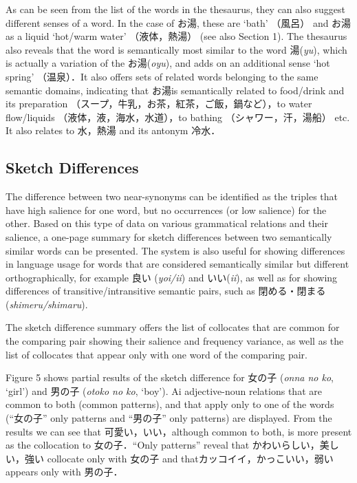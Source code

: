\documentclass[english]{jnlp_1.4}
\begin{document}
As can be seen from the list of the words in the thesaurus, they can also suggest different senses of a word. In the case of お湯, these are `bath' （風呂） and お湯 as a liquid `hot/warm water' （液体，熱湯） (see also Section 1). The thesaurus also reveals that the word is semantically most similar to the word 湯(\textit{yu}), which is actually a variation of the お湯(\textit{oyu}), and adds on an additional sense `hot spring' （温泉）．It also offers sets of related words belonging to the same semantic domains, indicating that お湯is semantically related to food/drink and its preparation （スープ，牛乳，お茶，紅茶，ご飯，鍋など），to water flow/liquids （液体，液，海水，水道），to bathing （シャワー，汗，湯船） etc. It also relates to 水，熱湯 and its antonym 冷水．



\subsection{Sketch Differences}

The difference between two near-synonyms can be identified as the triples that have high salience for one word, but no occurrences (or low salience) for the other. Based on this type of data on various grammatical relations and their salience, a one-page summary for sketch differences between two semantically similar words can be presented. The system is also useful for showing differences in language usage for words that are considered semantically similar but different orthographically, for example 良い (\textit{yoi/ii}) and いい(\textit{ii}), as well as for showing differences of transitive/intransitive semantic pairs, such as 閉める・閉まる(\textit{shimeru/shimaru}).

The sketch difference summary offers the list of collocates that are common for the comparing pair showing their salience and frequency variance, as well as the list of collocates that appear only with one word of the comparing pair. 

Figure 5 shows partial results of the sketch difference for 女の子 (\textit{onna no ko}, `girl') and 男の子 (\textit{otoko no ko}, `boy'). Ai adjective-noun relations that are common to both (common patterns), and that apply only to one of the words (``女の子'' only patterns and ``男の子'' only patterns) are displayed. From the results we can see that 可愛い，いい，although common to both, is more present as the collocation to 女の子．``Only patterns'' reveal that かわいらしい，美しい，強い collocate only with 女の子 and thatカッコイイ，かっこいい，弱い appears only with 男の子．
\end{document}
